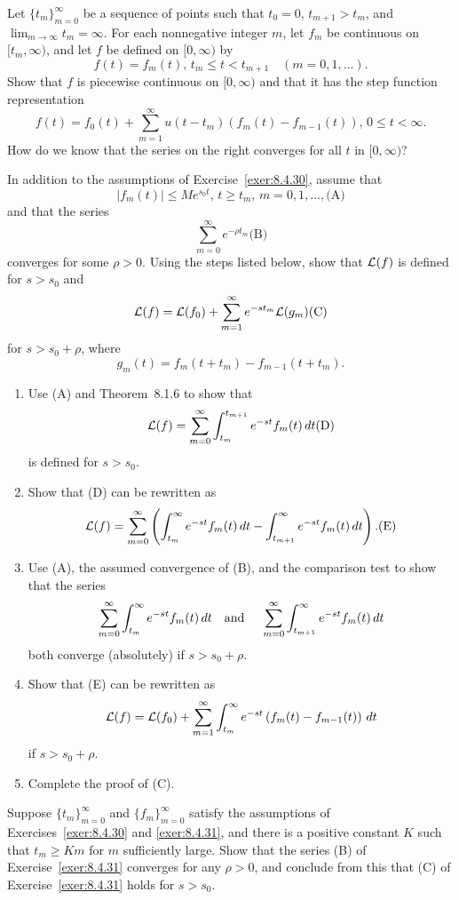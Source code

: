 \documentclass{ximera}
\begin{document}
\begin{problem}\label{exer:8.4.30}
Let $\{t_m\}_{m=0}^\infty$ be a sequence of points such that $t_0=0$,
$t_{m+1}>t_m$, and $\lim_{m\to\infty}t_m=\infty$. For each nonnegative
integer $m$, let $f_m$ be continuous on $[t_m,\infty)$, and let $f$ be
defined on $[0,\infty)$ by
$$
f(t)=f_m(t),\,t_m\le t<t_{m+1}\quad (m=0,1,\dots).
$$
Show that $f$ is piecewise continuous on $[0,\infty)$  and
that it has the step function representation
$$
f(t)=f_0(t)+\sum_{m=1}^\infty u(t-t_m)\left(f_m(t)-f_{m-1}(t)\right),\,
0\le t<\infty.
$$
How do we know that the series on the right converges for all $t$
in $[0,\infty)$?
\end{problem}

\begin{problem}\label{exer:8.4.31}
In addition to the assumptions of Exercise~\ref{exer:8.4.30},
assume that
$$
|f_m(t)|\le Me^{s_0t},\,t\ge t_m,\,m=0,1,\dots,
\text{(A)}
$$
and that the series
$$
\sum_{m=0}^\infty e^{-\rho t_m}
\text{(B)}
$$
converges for some $\rho>0$. Using the  steps listed below, show
that
${\cal L}(f)$ is defined for $s>s_0$  and
$$
{\cal L}(f)={\cal L}(f_0)+\sum_{m=1}^\infty e^{-st_m}{\cal L}(g_m)
\text{(C)}
$$
for $s>s_0+\rho$,
where
$$
g_m(t)=f_m(t+t_m)-f_{m-1}(t+t_m).
$$

\begin{enumerate} %
\item
Use (A) and Theorem~8.1.6 to show that
$$
{\cal L}(f)=\sum_{m=0}^\infty\int_{t_m}^{t_{m+1}}e^{-st}f_m(t)\,dt
\text{(D)}
$$
is defined for $s>s_0$.
\item %
Show that  (D) can be rewritten as
$$
{\cal L}(f)=\sum_{m=0}^\infty\left(\int_{t_m}^\infty e^{-st}f_m(t)\,dt
-\int_{t_{m+1}}^\infty e^{-st}f_m(t)\,dt\right).
\text{(E)}
$$
\item %
Use  (A), the assumed convergence of  (B), and the
comparison test  to show that the series
$$
\sum_{m=0}^\infty\int_{t_m}^\infty e^{-st}f_m(t)\,dt\mbox{\quad and \quad}
\sum_{m=0}^\infty\int_{t_{m+1}}^\infty e^{-st}f_m(t)\,dt
$$
both converge (absolutely) if $s>s_0+\rho$.
\item %
Show that  (E) can be rewritten as
 $$
{\cal L}(f)={\cal L}(f_0)+\sum_{m=1}^\infty\int_{t_m}^\infty e^{-st}
\left(f_m(t)-f_{m-1}(t)\right)\,dt
$$
if $s>s_0+\rho$.
\item %
Complete the proof of  (C).
\end{enumerate}
\end{problem}

\begin{problem}\label{exer:8.4.32} Suppose $\{t_m\}_{m=0}^\infty$ and
$\{f_m\}_{m=0}^\infty$ satisfy the assumptions of
Exercises~\ref{exer:8.4.30} and \ref{exer:8.4.31}, and
there is a positive constant $K$ such that $t_m\ge Km$ for $m$
sufficiently large. Show that the series (B) of
Exercise~\ref{exer:8.4.31} converges for any $\rho>0$, and conclude from
this that (C) of Exercise~\ref{exer:8.4.31} holds for $s>s_0$.
\end{problem}
\end{document}
